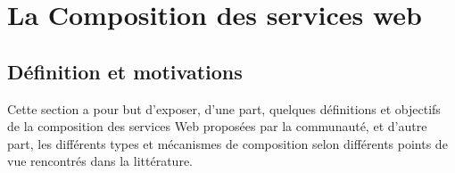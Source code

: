\chapter{La Composition des services web}



  

  

\newpage

  \section{Définition et motivations}
  \label{sec:defin-et-caract}

  Cette section a pour but d'exposer, d'une part, quelques définitions
  et objectifs de la composition des services Web proposées par la
  communauté, et d'autre part, les différents types et mécanismes de
  composition selon différents points de vue rencontrés dans la
  littérature.
  
